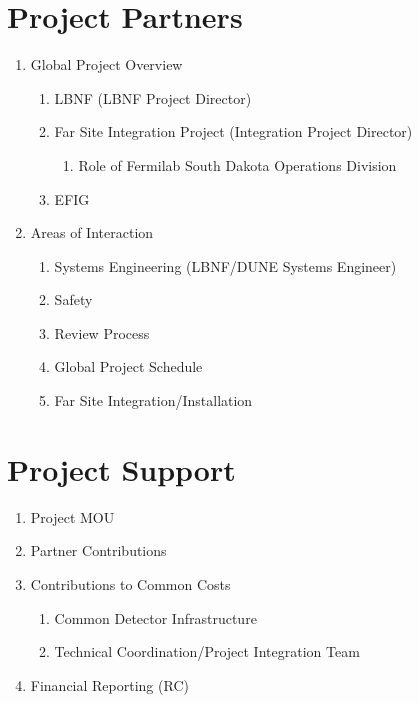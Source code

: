 \section{Project Partners}

\begin{enumerate}
  \item Global Project Overview
     \begin{enumerate}
       \item LBNF (LBNF Project Director)
       \item Far Site Integration Project  (Integration Project Director)
        \begin{enumerate}
          \item Role of Fermilab South Dakota Operations Division
        \end{enumerate}
       \item EFIG
     \end{enumerate}
  \item Areas of Interaction
     \begin{enumerate}
       \item Systems Engineering (LBNF/DUNE Systems Engineer)
       \item Safety
       \item Review Process
       \item Global Project Schedule
       \item Far Site Integration/Installation
     \end{enumerate}
\end{enumerate}


\section{Project Support}

\begin{enumerate}
  \item Project MOU
  \item Partner Contributions
  \item Contributions to Common Costs
     \begin{enumerate}
       \item Common Detector Infrastructure
       \item Technical Coordination/Project Integration Team
     \end{enumerate}
  \item Financial Reporting (RC)
\end{enumerate}
